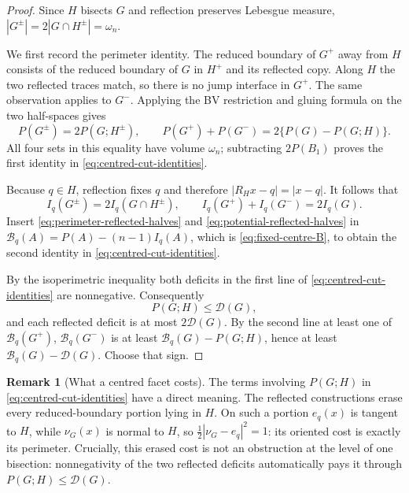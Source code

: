 \documentclass[11pt]{amsart}
\theoremstyle{definition}
\newtheorem{remark}[theorem]{Remark}
\newcommand{\Per}{P}
\newcommand{\Def}{\mathcal D}
\begin{document}
\begin{proof}
Since \(H\) bisects \(G\) and reflection preserves Lebesgue measure,
\(|G^\pm|=2|G\cap H^\pm|=\omega_n\).

We first record the perimeter identity.  The reduced boundary of
\(G^+\) away from \(H\) consists of the reduced boundary of \(G\) in
\(H^+\) and its reflected copy.  Along \(H\) the two reflected traces
match, so there is no jump interface in \(G^+\).  The same observation
applies to \(G^-\).  Applying the BV restriction and gluing formula
on the two half-spaces gives
\[
   \Per(G^\pm)=2\Per(G;H^\pm),
   \qquad
   \Per(G^+)+\Per(G^-)=2\{\Per(G)-\Per(G;H)\}.
\tag{6.7d}\label{eq:perimeter-reflected-halves}
\]
All four sets in this equality have volume \(\omega_n\); subtracting
\(2\Per(B_1)\) proves the first identity in
\eqref{eq:centred-cut-identities}.

Because \(q\in H\), reflection fixes \(q\) and therefore
\(|R_Hx-q|=|x-q|\).  It follows that
\[
   I_q(G^\pm)=2I_q(G\cap H^\pm),
   \qquad I_q(G^+)+I_q(G^-)=2I_q(G).
\tag{6.7e}\label{eq:potential-reflected-halves}
\]
Insert \eqref{eq:perimeter-reflected-halves} and
\eqref{eq:potential-reflected-halves} in
\(\mathcal B_q(A)=\Per(A)-(n-1)I_q(A)\), which is
\eqref{eq:fixed-centre-B}, to obtain the second identity in
\eqref{eq:centred-cut-identities}.

By the isoperimetric inequality both deficits in the first line of
\eqref{eq:centred-cut-identities} are nonnegative.  Consequently
\[
   \Per(G;H)\le\Def(G),
\]
and each reflected deficit is at most \(2\Def(G)\).  By the second
line at least one of
\(\mathcal B_q(G^+)\), \(\mathcal B_q(G^-)\) is at least
\(\mathcal B_q(G)-\Per(G;H)\), hence at least
\(\mathcal B_q(G)-\Def(G)\).  Choose that sign.
\end{proof}

\begin{remark}[What a centred facet costs]\label{rem:facet-loss}
The terms involving \(\Per(G;H)\) in
\eqref{eq:centred-cut-identities} have a direct meaning.  The
reflected constructions erase every reduced-boundary
portion lying in \(H\).  On such a portion \(e_q(x)\) is tangent to
\(H\), while \(\nu_G(x)\) is normal to \(H\), so
\(\tfrac12|\nu_G-e_q|^2=1\): its oriented cost is exactly its
perimeter.  Crucially, this erased cost is not an obstruction at the
level of one bisection: nonnegativity of the two reflected deficits
automatically pays it through \(\Per(G;H)\le\Def(G)\).
\end{remark}
\end{document}
